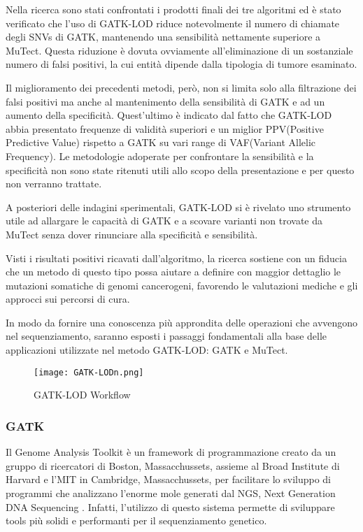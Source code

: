Nella ricerca sono stati confrontati i prodotti finali dei tre algoritmi ed è stato verificato che l'uso di GATK-LOD riduce notevolmente il numero di chiamate degli SNVs di GATK, mantenendo una sensibilità nettamente superiore a MuTect.
Questa riduzione è dovuta ovviamente all'eliminazione di un sostanziale numero di falsi positivi, la cui entità dipende dalla tipologia di tumore esaminato.

Il miglioramento dei precedenti metodi, però, non si limita solo alla filtrazione dei falsi positivi ma anche al mantenimento della sensibilità di GATK e ad un aumento della specificità.
Quest'ultimo è indicato dal fatto che GATK-LOD abbia presentato frequenze di validità superiori e un miglior PPV(Positive Predictive Value) rispetto a GATK su vari range di VAF(Variant Allelic Frequency).
Le metodologie adoperate per confrontare la sensibilità e la specificità non sono state ritenuti utili allo scopo della presentazione e per questo non verranno trattate.

A posteriori delle indagini sperimentali, GATK-LOD si è rivelato uno strumento utile ad allargare le capacità di GATK e a scovare varianti non trovate da MuTect senza dover rinunciare alla specificità e sensibilità.

Visti i risultati positivi ricavati dall'algoritmo, la ricerca sostiene con un fiducia che un metodo di questo tipo possa aiutare a definire con maggior dettaglio le mutazioni somatiche di genomi cancerogeni, favorendo le valutazioni mediche e gli approcci sui percorsi di cura.

In modo da fornire una conoscenza più approndita delle operazioni che avvengono nel sequenziamento, saranno esposti %
i passaggi fondamentali alla base delle applicazioni utilizzate nel metodo GATK-LOD: GATK e MuTect.
\begin{figure}[H]
\centering
\texttt{[image: GATK-LODn.png]}
\caption{GATK-LOD Workflow}
\label{fig: GATK-LODn}
\end{figure}


\subsubsection{GATK}
Il Genome Analysis Toolkit è un framework di programmazione creato da un gruppo di ricercatori di Boston, Massacchussets, assieme al Broad Institute di Harvard e l'MIT in Cambridge, Massacchussets, per facilitare lo sviluppo di programmi che analizzano l'enorme mole generati dal NGS, Next Generation DNA Sequencing \cite{McKenna2010}.
Infatti, l'utilizzo di questo sistema permette di sviluppare tools più solidi e performanti per il sequenziamento genetico.

